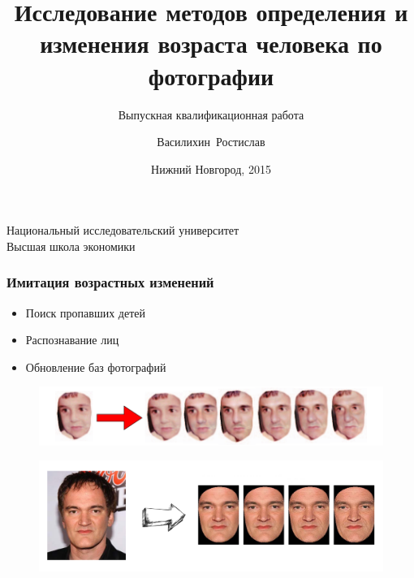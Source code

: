 \documentclass{beamer}
\begin{document}
\title[Age progression] %
{Исследование методов определения и изменения возраста человека по фотографии}
\subtitle{Выпускная квалификационная работа}
\author %
{Василихин~Ростислав}
\institute %
{
  Национальный исследовательский университет\\
  Высшая школа экономики
}
\date %
{Нижний Новгород, 2015}
\subject{Выпускная квалификационная работа}

\frame{\titlepage}
	
  \begin{frame}
  	\frametitle{Имитация возрастных изменений}
  	\begin{itemize}
	  	\item Поиск пропавших детей
	  	\item Распознавание лиц
	  	\item Обновление баз фотографий
  	\end{itemize}
  	\begin{figure}[t]
		\includegraphics[width=\textwidth]{ilaware_slide.png}
	\end{figure}
	\begin{figure}[t]
		\includegraphics[width=\textwidth]{quentin.png}
	\end{figure}
  \end{frame}
	
\end{document}
